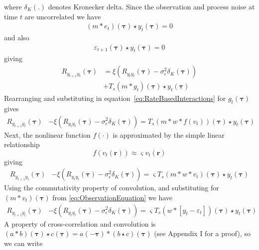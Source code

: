 \documentclass[]{article}
\newcommand{\parham}[1]{\textsf{\emph{\textbf{\textcolor{blue}{#1}}}}}
\begin{document}
where $\delta_{K}\left(.\right)$ denotes Kronecker delta. Since the observation and process noise at time $t$ are uncorrelated we have
\begin{align}
(m\ast  e_t)(\boldsymbol\tau) \star y_t(\boldsymbol\tau)=0
\end{align}
and also
\begin{align}
 \varepsilon_{t+1}(\boldsymbol\tau) \star y_t(\boldsymbol\tau)=0
\end{align}
giving 
\begin{align}
	R_{y_{t+1}y_t}(\boldsymbol{\tau}) &= \xi \left(R_{y_ty_t}(\boldsymbol{\tau})-\sigma_{\epsilon}^2  \delta_{K}\left(\boldsymbol\tau\right)\right)\nonumber \\
	&+ T_s(m\ast g_t)(\boldsymbol\tau) \star y_t(\boldsymbol\tau)
\end{align}
Rearranging and substituting in equation~\ref{eq:RateBasedInteractions} for $g_t(\boldsymbol\tau)$ gives
\begin{align}
	R_{y_{t+1}y_t}(\boldsymbol{\tau}) &-\xi \left(R_{y_ty_t}(\boldsymbol{\tau})-\sigma_{\epsilon}^2  \delta_{K}\left(\boldsymbol\tau\right)\right) =  T_s(m\ast w*f(v_t))(\boldsymbol\tau) \star y_t(\boldsymbol\tau)
\end{align}  
Next, the nonlinear function $f(\cdot)$ is approximated by the simple linear relationship
\begin{equation}
	f\left(v_t(\mathbf{r})\right) \approx \varsigma v_t(\mathbf{r})
\end{equation} 
giving
\begin{align}
	R_{y_{t+1}y_t}(\boldsymbol{\tau}) &-\xi \left(R_{y_ty_t}(\boldsymbol{\tau})-\sigma_{\epsilon}^2  \delta_{K}\left(\boldsymbol\tau\right)\right) = \varsigma T_s (m\ast w\ast v_t)(\boldsymbol\tau)\star y_t(\boldsymbol\tau)
\end{align} 
Using the commutativity property of convolution, and substituting for $(m\ast v_t)(\boldsymbol\tau)$ from \ref{eq:ObservationEquation} we have
\begin{align}
	R_{y_{t+1}y_t}(\boldsymbol{\tau})&-\xi \left(R_{y_ty_t}(\boldsymbol{\tau})-\sigma_{\epsilon}^2  \delta_{K}\left(\boldsymbol\tau\right)\right) =  \varsigma T_s \left( w\ast \left[y_t-\varepsilon_t \right]\right)(\boldsymbol\tau) \star y_t(\boldsymbol\tau)
\end{align}
A property of cross-correlation and convolution is $(a \ast b)(\boldsymbol\tau) \star c(\boldsymbol\tau) = a(-\boldsymbol\tau)\ast(b \star c)(\boldsymbol\tau)$ (see Appendix I for a proof), so we can write
\end{document}
